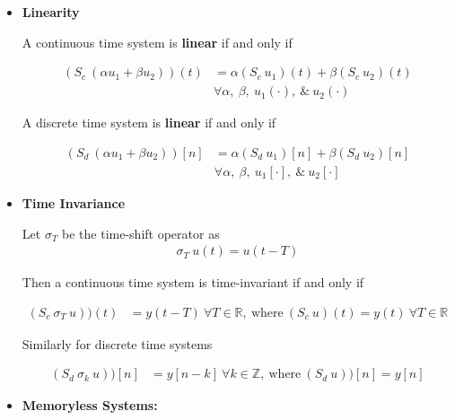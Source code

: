 \documentclass[12pt,oneside]{amsart}
\begin{document}
\begin{itemize}

\item \textbf{Linearity} 
\vspace{6pt}

A continuous time system is \textbf{linear} if and only if

\begin{align*}
(S_c \ (\alpha u_1 + \beta u_2) ) (t) &= \alpha  (S_c \ u_1) (t) +
  \beta  (S_c \ u_2 ) (t) \\ 
&\forall \alpha , \ \beta, \ u_1(\cdot), \ \& \ u_2(\cdot) 
\end{align*}

A discrete time system is \textbf{linear} if and only if

\begin{align*}
(S_d \ (\alpha u_1 + \beta u_2) ) [n] &= \alpha  (S_d \ u_1) [n] +
  \beta  (S_d \ u_2 ) [n] \\ 
&\forall \alpha , \ \beta, \ u_1[\cdot], \ \& \ u_2[\cdot] 
\end{align*}

\item \textbf{Time Invariance}
\vspace{6pt}

Let $\sigma_T$ be the time-shift operator as
%
\begin{align*}
\sigma_T \ u(t) = u(t-T)
\end{align*}

Then a continuous time system is time-invariant if and only if 

\begin{align*}
(S_c \ \sigma_T \ u) ) (t) &= y(t - T) \ \forall T \in \mathbb{R}, \
                             \mathrm{where} \ (S_c \ u ) (t) = y(t) \ \forall T \in \mathbb{R}
\end{align*}

\vspace{6pt}

Similarly for discrete time systems

\begin{align*}
(S_d \ \sigma_k \ u) ) [n] &= y[n-k] \ \forall k \in \mathbb{Z}, \ \mathrm{where} \ (S_d \ u) ) [n] = y[n]
\end{align*}

\vspace{6pt}

\item \textbf{Memoryless Systems:}

\vspace{6pt}


\end{itemize}
\end{document}
